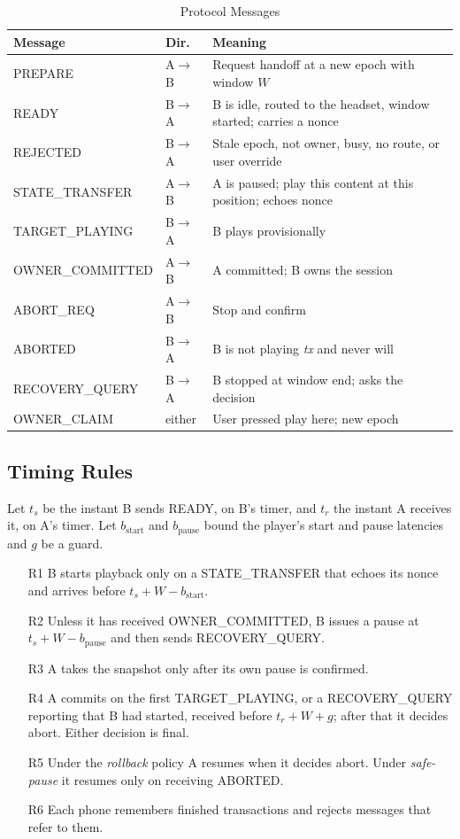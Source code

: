 \documentclass[conference]{IEEEtran}
\begin{document}
\begin{table}[t]
\caption{Protocol Messages}
\label{tab:msgs}
\centering
\footnotesize
\setlength{\tabcolsep}{4pt}
\begin{tabularx}{\columnwidth}{@{}>{\scriptsize\raggedright\arraybackslash}p{2.55cm}L{0.72cm}Y@{}}
\toprule
\textbf{Message} & \textbf{Dir.} & \textbf{Meaning} \\
\midrule
PREPARE & A$\to$B & Request handoff at a new epoch with window $W$ \\
READY & B$\to$A & B is idle, routed to the headset, window started; carries a nonce \\
REJECTED & B$\to$A & Stale epoch, not owner, busy, no route, or user override \\
STATE\_TRANSFER & A$\to$B & A is paused; play this content at this position; echoes nonce \\
TARGET\_PLAYING & B$\to$A & B plays provisionally \\
OWNER\_COMMITTED & A$\to$B & A committed; B owns the session \\
ABORT\_REQ & A$\to$B & Stop and confirm \\
ABORTED & B$\to$A & B is not playing \textit{tx} and never will \\
RECOVERY\_QUERY & B$\to$A & B stopped at window end; asks the decision \\
OWNER\_CLAIM & either & User pressed play here; new epoch \\
\bottomrule
\end{tabularx}
\end{table}

\subsection{Timing Rules}

Let $t_s$ be the instant B sends READY, on B's timer, and $t_r$ the instant A receives it, on A's timer. Let $b_{\mathrm{start}}$ and $b_{\mathrm{pause}}$ bound the player's start and pause latencies and $g$ be a guard.

\begin{itemize}
\item[R1] B starts playback only on a STATE\_TRANSFER that echoes its nonce and arrives before $t_s + W - b_{\mathrm{start}}$.
\item[R2] Unless it has received OWNER\_COMMITTED, B issues a pause at $t_s + W - b_{\mathrm{pause}}$ and then sends RECOVERY\_QUERY.
\item[R3] A takes the snapshot only after its own pause is confirmed.
\item[R4] A commits on the first TARGET\_PLAYING, or a RECOVERY\_QUERY reporting that B had started, received before $t_r + W + g$; after that it decides abort. Either decision is final.
\item[R5] Under the \emph{rollback} policy A resumes when it decides abort. Under \emph{safe-pause} it resumes only on receiving ABORTED.
\item[R6] Each phone remembers finished transactions and rejects messages that refer to them.
\end{itemize}
\end{document}
